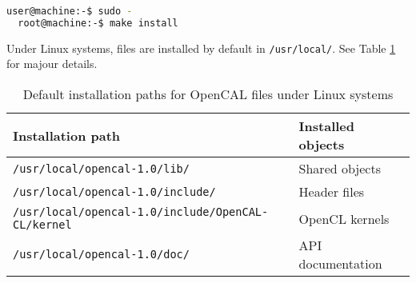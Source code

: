 \begin{lstlisting}[numbers=none,language=bash,label={ch:quickstart:install}]
  user@machine:-$ sudo -
  root@machine:-$ make install
\end{lstlisting}


\noindent Under Linux systems, files are installed by default in
\texttt{/usr/local/}. See Table \ref{ch:ddefault_paths} for majour
details.

\begin{table}[h]
  \centering
  \caption{Default installation paths for OpenCAL files under Linux systems}
  \label{ch:ddefault_paths}
  \begin{tabularx}{\textwidth}{ll}
    \hline
    \textbf{Installation path} & \textbf{Installed objects}\\
    \hline
    \verb'/usr/local/opencal-1.0/lib/'                   & Shared objects \\
    \verb'/usr/local/opencal-1.0/include/'                & Header files \\
    \verb'/usr/local/opencal-1.0/include/OpenCAL-CL/kernel' & OpenCL kernels \\
    \verb'/usr/local/opencal-1.0/doc/'                   & API documentation \\
    \hline
  \end{tabularx}
\end{table}



